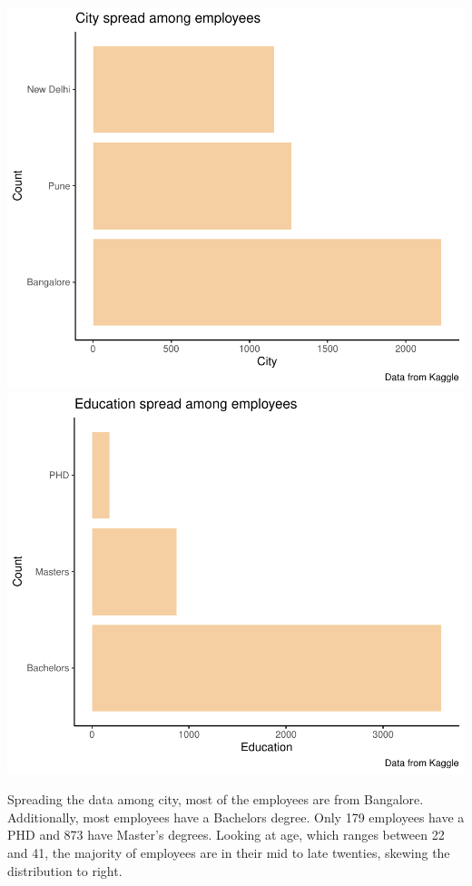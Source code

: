 \documentclass[11pt,preprint, authoryear]{elsarticle}
\numberwithin{equation}{section}
\numberwithin{figure}{section}
\numberwithin{table}{section}
\begin{document}
\includegraphics{Final_project_files/figure-latex/unnamed-chunk-2-1.pdf}
\includegraphics{Final_project_files/figure-latex/unnamed-chunk-2-2.pdf}

Spreading the data among city, most of the employees are from Bangalore.
Additionally, most employees have a Bachelors degree. Only 179 employees
have a PHD and 873 have Master's degrees. Looking at age, which ranges
between 22 and 41, the majority of employees are in their mid to late
twenties, skewing the distribution to right.
\end{document}

